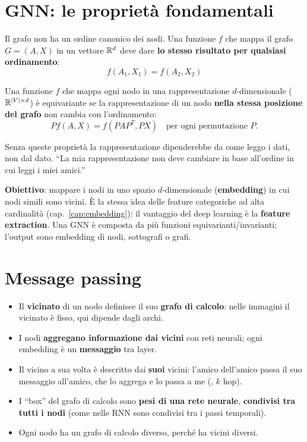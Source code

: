 \section{GNN: le proprietà fondamentali}
\begin{definizione}
Il grafo non ha un ordine canonico dei nodi. Una funzione $f$ che mappa il grafo $G=(A,X)$ in un vettore $\mathbb{R}^d$ deve dare
\textbf{lo stesso risultato per qualsiasi ordinamento}:
\[ f(A_1, X_1) = f(A_2, X_2) \]
\end{definizione}
\begin{definizione}
Una funzione $f$ che mappa ogni nodo in una rappresentazione $d$-dimensionale ($\mathbb{R}^{|V|\times d}$) è equivariante se la
rappresentazione di un nodo \textbf{nella stessa posizione del grafo} non cambia con l'ordinamento:
\[ P f(A,X) = f(PAP^T, PX) \quad \text{per ogni permutazione } P. \]
\end{definizione}
Senza queste proprietà la rappresentazione dipenderebbe da come leggo i dati, non dal dato. ``La mia rappresentazione non deve cambiare
in base all'ordine in cui leggi i miei amici.''

\textbf{Obiettivo}: mappare i nodi in uno spazio $d$-dimensionale (\textbf{embedding}) in cui nodi simili sono vicini. È la stessa idea
delle feature categoriche ad alta cardinalità (cap.~\ref{cap:embedding}): il vantaggio del deep learning è la \textbf{feature extraction}.
Una GNN è composta da più funzioni equivarianti/invarianti; l'output sono embedding di nodi, sottografi o grafi.

\section{Message passing}
\begin{itemize}
  \item Il \textbf{vicinato} di un nodo definisce il suo \textbf{grafo di calcolo}: nelle immagini il vicinato è fisso, qui dipende dagli archi.
  \item I nodi \textbf{aggregano informazione dai vicini} con reti neurali; ogni embedding è un \textbf{messaggio} tra layer.
  \item Il vicino a sua volta è descritto dai \textbf{suoi} vicini: l'amico dell'amico passa il suo messaggio all'amico, che lo aggrega e lo
        passa a me (, $k$ hop).
  \item I ``box'' del grafo di calcolo sono \textbf{pesi di una rete neurale}, \textbf{condivisi tra tutti i nodi} (come nelle RNN sono
        condivisi tra i passi temporali).
  \item Ogni nodo ha un grafo di calcolo diverso, perché ha vicini diversi.
\end{itemize}


